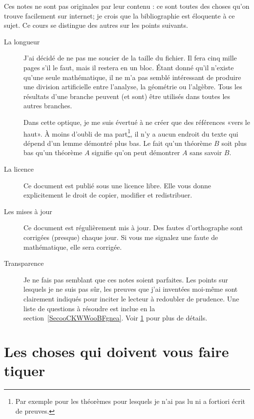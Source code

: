 Ces notes ne sont pas originales par leur contenu : ce sont toutes des choses qu'on trouve facilement sur internet; je crois que la bibliographie est éloquente à ce sujet. Ce cours se distingue des autres sur les points suivants.
\begin{description}
	\item[La longueur] J'ai décidé de ne pas me soucier de la taille du fichier. Il fera cinq mille pages s'il le faut, mais il restera en un bloc. Étant donné qu'il n'existe qu'une seule mathématique, il ne m'a pas semblé intéressant de produire une division artificielle entre l'analyse, la géométrie ou l'algèbre. Tous les résultats d'une branche peuvent (et sont) être utilisés dans toutes les autres branches.

		Dans cette optique, je me suis évertué à ne créer que des références «vers le haut». À moins d'oubli de ma part\footnote{Par exemple pour les théorèmes pour lesquels je n'ai pas lu ni a fortiori écrit de preuves.}, il n'y a aucun endroit du texte qui dépend d'un lemme démontré plus bas. Le fait qu'un théorème \( B\) soit plus bas qu'un théorème \( A\) signifie qu'on peut démontrer \( A\) sans savoir \( B\).

	\item[La licence] Ce document est publié sous une licence libre. Elle vous donne explicitement le droit de copier, modifier et redistribuer.

	\item[Les mises à jour] Ce document est régulièrement mis à jour. Des fautes d'orthographe sont corrigées (presque) chaque jour. Si vous me signalez une faute de mathématique, elle sera corrigée.
	\item[Transparence] Je ne fais pas semblant que ces notes soient parfaites. Les points sur lesquels je ne suis pas sûr, les preuves que j'ai inventées moi-même sont clairement indiqués pour inciter le lecteur à redoubler de prudence. Une liste de questions à résoudre est inclue en la section~\ref{SecooCKWWooBFgnea}. Voir \ref{SECooWVHBooCaYoXP} pour plus de détails.
\end{description}

\section{Les choses qui doivent vous faire tiquer}
\label{SECooWVHBooCaYoXP}

